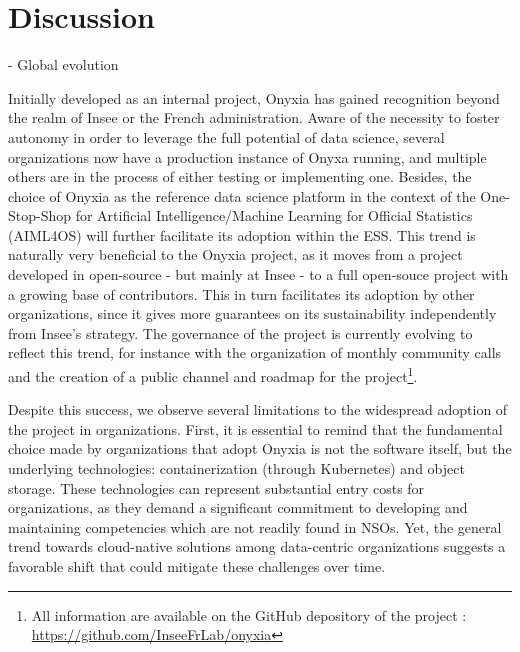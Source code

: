 \section{Discussion}

- Global evolution

Initially developed as an internal project, Onyxia has gained recognition beyond the realm of Insee or the French administration. Aware of the necessity to foster autonomy in order to leverage the full potential of data science, several organizations now have a production instance of Onyxa running, and multiple others are in the process of either testing or implementing one. Besides, the choice of Onyxia as the reference data science platform in the context of the One-Stop-Shop for Artificial Intelligence/Machine Learning for Official Statistics (AIML4OS) will further facilitate its adoption within the ESS. This trend is naturally very beneficial to the Onyxia project, as it moves from a project developed in open-source - but mainly at Insee - to a full open-souce project with a growing base of contributors. This in turn facilitates its adoption by other organizations, since it gives more guarantees on its sustainability independently from Insee's strategy. The governance of the project is currently evolving to reflect this trend, for instance with the organization of monthly community calls and the creation of a public channel and roadmap for the project\footnote{All information are available on the GitHub depository of the project : \url{https://github.com/InseeFrLab/onyxia}}.

Despite this success, we observe several limitations to the widespread adoption of the project in organizations. First, it is essential to remind that the fundamental choice made by organizations that adopt Onyxia is not the software itself, but the underlying technologies: containerization (through Kubernetes) and object storage. These technologies can represent substantial entry costs for organizations, as they demand a significant commitment to developing and maintaining competencies which are not readily found in NSOs. Yet, the general trend towards cloud-native solutions among data-centric organizations suggests a favorable shift that could mitigate these challenges over time.

